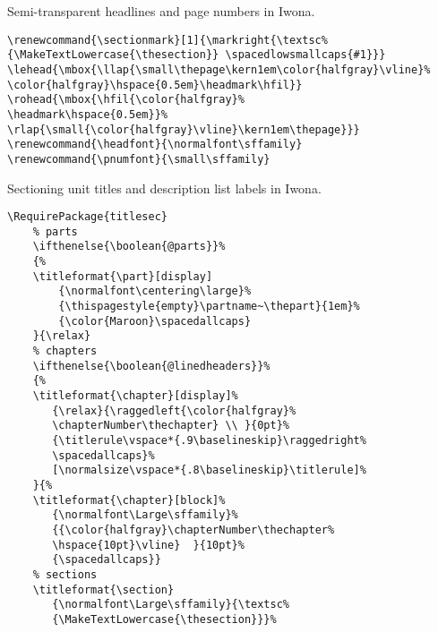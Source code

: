 Semi-transparent headlines and page numbers in Iwona.
\begin{lstlisting}
\renewcommand{\sectionmark}[1]{\markright{\textsc%
{\MakeTextLowercase{\thesection}} \spacedlowsmallcaps{#1}}}
\lehead{\mbox{\llap{\small\thepage\kern1em\color{halfgray}\vline}%
\color{halfgray}\hspace{0.5em}\headmark\hfil}}
\rohead{\mbox{\hfil{\color{halfgray}%
\headmark\hspace{0.5em}}%
\rlap{\small{\color{halfgray}\vline}\kern1em\thepage}}}
\renewcommand{\headfont}{\normalfont\sffamily}
\renewcommand{\pnumfont}{\small\sffamily}
\end{lstlisting}



Sectioning unit titles and description list labels in Iwona.
\begin{lstlisting}
\RequirePackage{titlesec}
    % parts
    \ifthenelse{\boolean{@parts}}%
    {%
    \titleformat{\part}[display]
        {\normalfont\centering\large}%
        {\thispagestyle{empty}\partname~\thepart}{1em}%
        {\color{Maroon}\spacedallcaps}
    }{\relax}
    % chapters
    \ifthenelse{\boolean{@linedheaders}}%
    {%
    \titleformat{\chapter}[display]%
       {\relax}{\raggedleft{\color{halfgray}%
       \chapterNumber\thechapter} \\ }{0pt}%
       {\titlerule\vspace*{.9\baselineskip}\raggedright%
       \spacedallcaps}%
       [\normalsize\vspace*{.8\baselineskip}\titlerule]%
    }{%
    \titleformat{\chapter}[block]%
       {\normalfont\Large\sffamily}%
       {{\color{halfgray}\chapterNumber\thechapter%
       \hspace{10pt}\vline}  }{10pt}%
       {\spacedallcaps}}
    % sections
    \titleformat{\section}
       {\normalfont\Large\sffamily}{\textsc%
       {\MakeTextLowercase{\thesection}}}%

\end{lstlisting}
